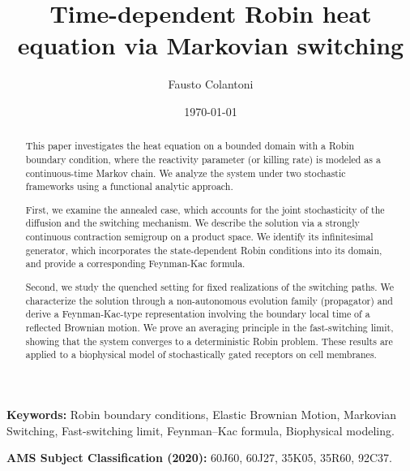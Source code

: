 \documentclass[11pt]{amsart}
\theoremstyle{plain}
\theoremstyle{definition}
\theoremstyle{remark}
\begin{document}
	
	\title{Time-dependent Robin heat equation via Markovian switching}
	\author{Fausto Colantoni}
	\address{Institute of Mathematical Finance, Ulm University, Ulm, Germany}

	\date{\today}
	\maketitle
	\begin{abstract}
	This paper investigates the heat equation on a bounded domain with a Robin boundary condition, where the reactivity parameter (or killing rate) is modeled as a continuous-time Markov chain. We analyze the system under two stochastic frameworks using a functional analytic approach.
	
	First, we examine the annealed case, which accounts for the joint stochasticity of the diffusion and the switching mechanism. We describe the solution via a strongly continuous contraction semigroup on a product space. We identify its infinitesimal generator, which incorporates the state-dependent Robin conditions into its domain, and provide a corresponding Feynman-Kac formula.
	
Second, we study the quenched setting for fixed realizations of the switching paths. We characterize the solution through a non-autonomous evolution family (propagator) and derive a Feynman-Kac-type representation involving the boundary local time of a reflected Brownian motion. We prove an averaging principle in the fast-switching limit, showing that the system converges to a deterministic Robin problem. These results are applied to a biophysical model of stochastically gated receptors on cell membranes.
	\end{abstract}
	
	\vspace{1em}
	
	\noindent \textbf{Keywords:} Robin boundary conditions, Elastic Brownian Motion, Markovian Switching, Fast-switching limit, Feynman--Kac formula, Biophysical modeling.
	
	\vspace{1em}
	
	\noindent \textbf{AMS Subject Classification (2020):} 
	60J60, %
	60J27, %
	35K05, %
	35R60, %
	92C37. %
\end{document}
